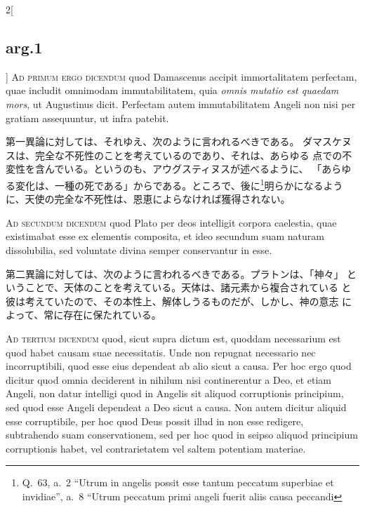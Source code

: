 \documentclass[paper=a4paper,fontsize=10pt,jafontsize=9pt,titlepage]{jlreq}
\begin{document}
\begin{paracol}{2}[\subsection{arg.1}]
{\scshape Ad primum ergo dicendum} quod Damascenus accipit
immortalitatem perfectam, quae includit omnimodam immutabilitatem, quia
{\itshape omnis mutatio est quaedam mors}, ut Augustinus
dicit. Perfectam autem immutabilitatem Angeli non nisi per gratiam
assequuntur, ut infra patebit.

\switchcolumn

第一異論に対しては、それゆえ、次のように言われるべきである。
ダマスケヌスは、完全な不死性のことを考えているのであり、それは、あらゆる
点での不変性を含んでいる。というのも、アウグスティヌスが述べるように、
「あらゆる変化は、一種の死である」からである。ところで、後に\footnote{
Q.~63, a.~2 ``Utrum in angelis possit esse tantum peccatum superbiae et
 invidiae'', a.~8 ``Utrum peccatum primi angeli fuerit aliis causa peccandi
}明らかになるように、天使の完全な不死性は、恩恵によらなければ獲得されない。

\switchcolumn*[\subsection{ad.2}]

{\scshape Ad secundum dicendum} quod Plato per deos
intelligit corpora caelestia, quae existimabat esse ex elementis
composita, et ideo secundum suam naturam dissolubilia, sed voluntate
divina semper conservantur in esse.

\switchcolumn

第二異論に対しては、次のように言われるべきである。プラトンは、「神々」
ということで、天体のことを考えている。天体は、諸元素から複合されている
と彼は考えていたので、その本性上、解体しうるものだが、しかし、神の意志
によって、常に存在に保たれている。

\switchcolumn*[\subsection{ad.3}]

{\scshape Ad tertium dicendum} quod, sicut supra dictum est, quoddam
necessarium est quod habet causam suae necessitatis. Unde non repugnat
necessario nec incorruptibili, quod esse eius dependeat ab alio sicut
a causa. Per hoc ergo quod dicitur quod omnia deciderent in nihilum
nisi continerentur a Deo, et etiam Angeli, non datur intelligi quod in
Angelis sit aliquod corruptionis principium, sed quod esse Angeli
dependeat a Deo sicut a causa. Non autem dicitur aliquid esse
corruptibile, per hoc quod Deus possit illud in non esse redigere,
subtrahendo suam conservationem, sed per hoc quod in seipso aliquod
principium corruptionis habet, vel contrarietatem vel saltem potentiam
materiae.


\end{paracol}
\end{document}
